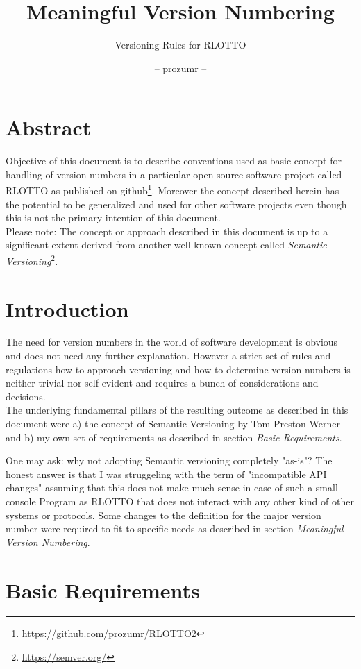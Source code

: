 \documentclass[10pt,a4paper]{article}
\author{-- prozumr --}
\title{Meaningful Version Numbering}
\subtitle{Versioning Rules for \linebreak RLOTTO}
\begin{document}
\maketitle
\pagebreak[4]
\section*{Abstract}
Objective of this document is to describe conventions used as basic concept for handling of version numbers in a particular open source software project called RLOTTO as published on github\footnote{\url{https://github.com/prozumr/RLOTTO2}}. Moreover the concept described herein has the potential to be generalized and used for other software projects even though this is not the primary intention of this document. 
\\
Please note: The concept or approach described in this document is up to a significant extent derived from another well known concept called \textit{Semantic Versioning}\footnote{\url{https://semver.org/}}. 

\section*{Introduction}

The need for version numbers in the world of software development is obvious and does not need any further explanation. However a strict set of rules and regulations how to approach versioning and how to determine version numbers is neither trivial nor self-evident and requires a bunch of considerations and decisions. 
\\
The underlying fundamental pillars of the resulting outcome as described in this document were a) the concept of Semantic Versioning by Tom Preston-Werner and b) my own set of requirements as described in section \textit{Basic Requirements}.

One may ask: why not adopting Semantic versioning completely "as-is"? The honest answer is that I was struggeling with the term of "incompatible API changes" assuming that this does not make much sense in case of such a small console Program as RLOTTO that does not interact with any other kind of other systems or protocols. Some changes to the definition for the major version number were required to fit to specific needs as described in section \textit{Meaningful Version Numbering}.

\section*{Basic Requirements}
\end{document}
